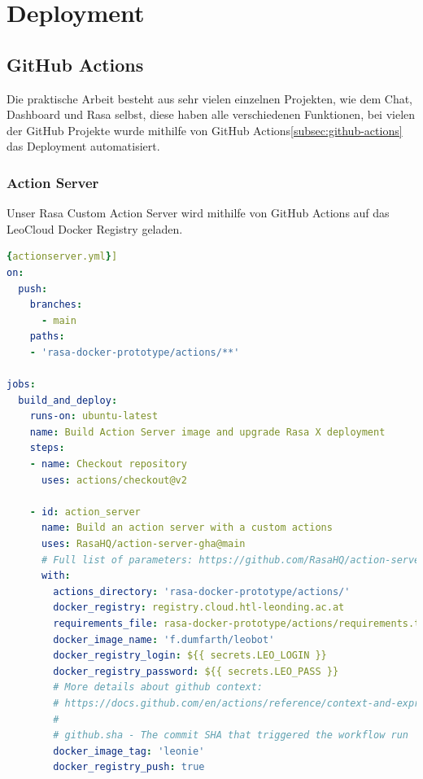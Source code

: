 \section{Deployment}

\subsection{GitHub Actions}

Die praktische Arbeit besteht aus sehr vielen einzelnen Projekten, wie dem Chat, Dashboard und Rasa selbst, diese haben alle verschiedenen Funktionen, bei vielen der GitHub Projekte wurde mithilfe von GitHub Actions\ref{subsec:github-actions} das Deployment automatisiert.

\subsubsection{Action Server}
Unser Rasa Custom Action Server wird mithilfe von GitHub Actions auf das LeoCloud Docker Registry geladen.

\begin{lstlisting}[language=yaml,label={lst:actionserveryml},caption={action\_server.yml}]{actionserver.yml}]
on:
  push:
    branches:
      - main
    paths:
    - 'rasa-docker-prototype/actions/**'

jobs:
  build_and_deploy:
    runs-on: ubuntu-latest
    name: Build Action Server image and upgrade Rasa X deployment
    steps:
    - name: Checkout repository
      uses: actions/checkout@v2

    - id: action_server
      name: Build an action server with a custom actions
      uses: RasaHQ/action-server-gha@main
      # Full list of parameters: https://github.com/RasaHQ/action-server-gha/tree/master#input-arguments
      with:
        actions_directory: 'rasa-docker-prototype/actions/'
        docker_registry: registry.cloud.htl-leonding.ac.at
        requirements_file: rasa-docker-prototype/actions/requirements.txt
        docker_image_name: 'f.dumfarth/leobot'
        docker_registry_login: ${{ secrets.LEO_LOGIN }}
        docker_registry_password: ${{ secrets.LEO_PASS }}
        # More details about github context:
        # https://docs.github.com/en/actions/reference/context-and-expression-syntax-for-github-actions#github-context
        #
        # github.sha - The commit SHA that triggered the workflow run
        docker_image_tag: 'leonie'
        docker_registry_push: true
\end{lstlisting}

